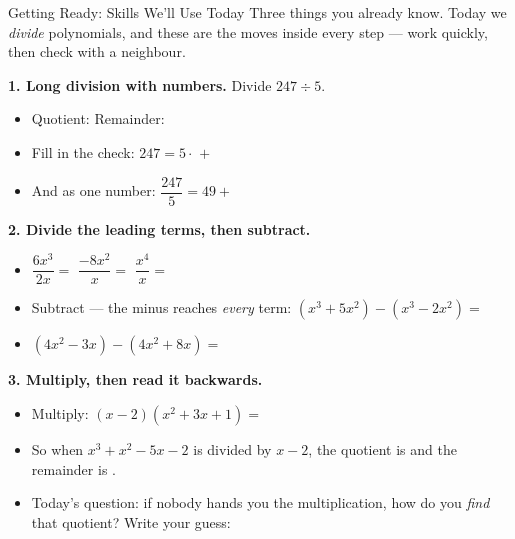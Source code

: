 \documentclass[12pt]{article}
\begin{document}

\vspace{0.10in}

\begin{notesbox}{Getting Ready: Skills We'll Use Today}
Three things you already know. Today we \emph{divide} polynomials, and these are the moves
inside every step --- work quickly, then check with a neighbour.

\vspace{6pt}
\textbf{1. Long division with numbers.} Divide $247 \div 5$.
\begin{itemize}[leftmargin=1.6em, itemsep=6pt]
  \item Quotient: \blank{1.2cm} \qquad Remainder: \blank{1.2cm}
  \item Fill in the check: \; $247 = 5 \cdot$ \blank{1.2cm} $+$ \blank{1.2cm}
  \item And as one number: \; $\dfrac{247}{5} = 49 + $ \blank{1.2cm}
\end{itemize}

\vspace{8pt}
\textbf{2. Divide the leading terms, then subtract.}
\begin{itemize}[leftmargin=1.6em, itemsep=8pt]
  \item $\dfrac{6x^3}{2x} = $ \blank{1.6cm} \qquad $\dfrac{-8x^2}{x} = $ \blank{1.6cm}
        \qquad $\dfrac{x^4}{x} = $ \blank{1.6cm}
  \item Subtract --- the minus reaches \emph{every} term:
        \; $(x^3 + 5x^2) - (x^3 - 2x^2) = $ \blank{1.8cm}
  \item $(4x^2 - 3x) - (4x^2 + 8x) = $ \blank{1.8cm}
\end{itemize}

\vspace{8pt}
\textbf{3. Multiply, then read it backwards.}
\begin{itemize}[leftmargin=1.6em, itemsep=8pt]
  \item Multiply: \; $(x - 2)(x^2 + 3x + 1) = $ \blank{4.2cm}
  \item So when $x^3 + x^2 - 5x - 2$ is divided by $x - 2$, the quotient is \blank{3.0cm}
        and the remainder is \blank{1.2cm}.
  \item Today's question: if nobody hands you the multiplication, how do you \emph{find} that
        quotient? Write your guess: \blank{4.0cm}
\end{itemize}
\end{notesbox}
\end{document}
